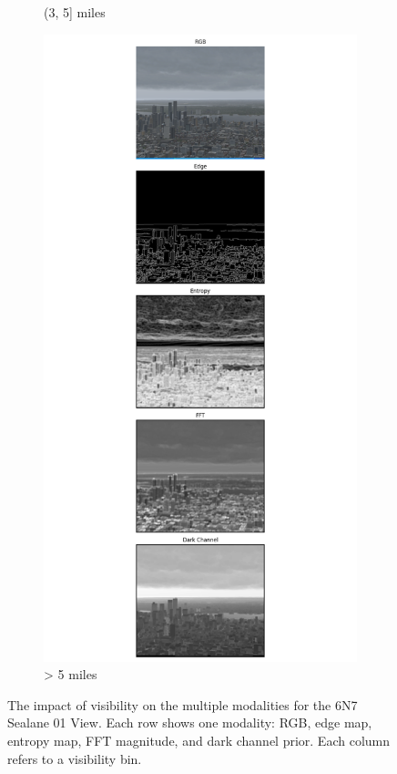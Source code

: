\begin{figure}
\begin{subfigure}[b]{0.15\textwidth}
      \caption{(3, 5] miles}
      \label{subfig:bin3}
    \end{subfigure}
    \begin{subfigure}[b]{0.15\textwidth}
      \includegraphics[width=\textwidth, trim={7.5cm 0 7.5cm 0},clip]{imgs/examples/exp_0_featuresMiles_46.1462462872979_featuresM_74265_features.png}
      \caption{> 5 miles}
      \label{subfig:bin4}
    \end{subfigure}
  
  \caption{The impact of visibility on the multiple modalities for the 6N7 Sealane 01 View. Each row shows one modality: RGB, edge map, entropy map, FFT magnitude, and dark channel prior. Each column refers to a visibility bin.}
  \label{fig:impact_vis_deg_features}
\end{figure}


